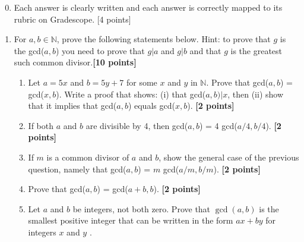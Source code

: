\documentclass{article}
\begin{document}
\begin{enumerate}
\setcounter{enumi}{-1} 
\item Each answer is clearly written and each answer is correctly mapped to its rubric on Gradescope. [4 points]

\item  For $a,b \in \mathbb{N}$, prove the following statements below. Hint: to prove that $g$ is the gcd($a,b$) you need to prove that $g | a$ and $g|b$ and that $g$ is the greatest such common divisor.\textbf{[10 points]}
\begin{enumerate}
    \item Let $a = 5x$ and $b = 5y+7$ for some $x$ and $y$ in $\mathbb{N}$. Prove that gcd($a,b$) = gcd($x,b$). Write a proof that shows: (i) that gcd($a,b)| x$, then (ii) show that it implies that gcd($a,b$) equals gcd($x,b$). \textbf{[2 points]}
    \item If both $a$ and $b$ are divisible by 4, then gcd($a,b$) = 4 gcd($a/4,b/4$). \textbf{[2 points]}
    \item If $m$ is a common divisor of $a$ and $b$, show the general case of the previous question, namely that gcd($a,b$) = $m$ gcd($a/m,b/m$). \textbf{[2 points]}
    \item Prove that gcd($a,b$) = gcd($a+b,b$). \textbf{[2 points]}
    \item Let \(a\)  and \(b\)  be integers, not both zero. Prove that \(\gcd ( a , b )\)  is the smallest positive integer that can be written in the form \(ax+by\) for integers \(x\)  and \(y\) .
\end{enumerate}


\end{enumerate}
\end{document}
